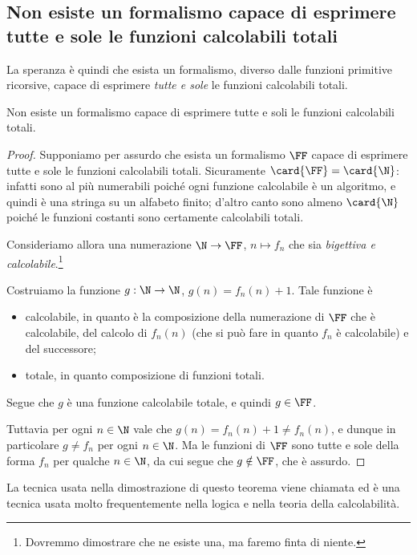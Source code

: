 \subsection{Non esiste un formalismo capace di esprimere tutte e sole le funzioni calcolabili totali}

La speranza è quindi che esista un formalismo, diverso dalle funzioni primitive ricorsive, capace di esprimere \emph{tutte e sole} le funzioni calcolabili totali. 

\begin{theorem}
    Non esiste un formalismo capace di esprimere tutte e soli le funzioni calcolabili totali.
\end{theorem}
\begin{proof}
    Supponiamo per assurdo che esista un formalismo $\FF$ capace di esprimere tutte e sole le funzioni calcolabili totali. Sicuramente $\card{\FF} = \card{\N}$: infatti sono al più numerabili poiché ogni funzione calcolabile è un algoritmo, e quindi è una stringa su un alfabeto finito; d'altro canto sono almeno $\card{\N}$ poiché le funzioni costanti sono certamente calcolabili totali.
    
    Consideriamo allora una numerazione $\N \to \FF$, $n \mapsto f_n$ che sia \emph{bigettiva e calcolabile}.\footnote{Dovremmo dimostrare che ne esiste una, ma faremo finta di niente.}
    
    Costruiamo la funzione $g : \N \to \N$, $g(n) = f_n(n) + 1$. Tale funzione è \begin{itemize}
        \item calcolabile, in quanto è la composizione della numerazione di $\FF$ che è calcolabile, del calcolo di $f_n(n)$ (che si può fare in quanto $f_n$ è calcolabile) e del successore;
        \item totale, in quanto composizione di funzioni totali.    
    \end{itemize}  
    Segue che $g$ è una funzione calcolabile totale, e quindi $g \in \FF$.
    
    Tuttavia per ogni $n \in \N$ vale che $g(n) = f_n(n) + 1 \neq f_n(n)$, e dunque in particolare $g \neq f_n$ per ogni $n \in \N$. Ma le funzioni di $\FF$ sono tutte e sole della forma $f_n$ per qualche $n \in \N$, da cui segue che $g \notin \FF$, che è assurdo.     
\end{proof}

La tecnica usata nella dimostrazione di questo teorema viene chiamata  ed è una tecnica usata molto frequentemente nella logica e nella teoria della calcolabilità.